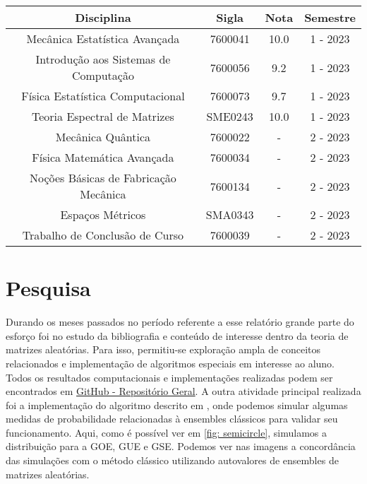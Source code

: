 \documentclass[12pt]{report}
\begin{document}
	\hspace{1cm}
	
	\begin{center}
		\begin{tabular}{|c|c|c|c|}
			\hline
			Disciplina & Sigla & Nota & Semestre \\
			\hline
			Mecânica Estatística Avançada & 7600041 & 10.0 & 1 - 2023 \\
			\hline
			Introdução aos Sistemas de Computação & 7600056 & 9.2 & 1 - 2023 \\
			\hline
			Física Estatística Computacional & 7600073 & 9.7 & 1 - 2023 \\
			\hline
			Teoria Espectral de Matrizes & SME0243 & 10.0 & 1 - 2023 \\
			\hline
			Mecânica Quântica & 7600022 & - & 2 - 2023 \\
			\hline
			Física Matemática Avançada & 7600034 & - & 2 - 2023 \\
			\hline
			Noções Básicas de Fabricação Mecânica & 7600134 & - & 2 - 2023 \\
			\hline
			Espaços Métricos & SMA0343 & - & 2 - 2023 \\
			\hline
			Trabalho de Conclusão de Curso & 7600039 & - & 2 - 2023 \\
			\hline
		\end{tabular}
	\end{center}
	
	\section{Pesquisa}
	
	Durando os meses passados no período referente a esse relatório grande parte do esforço foi no estudo da bibliografia e conteúdo de interesse dentro da teoria de matrizes aleatórias. Para isso, permitiu-se exploração ampla de conceitos relacionados e implementação de algoritmos especiais em interesse ao aluno. Todos os resultados computacionais e implementações realizadas podem ser encontrados em \href{https://github.com/Joao-vap/RMT-Code/tree/main}{GitHub - Repositório Geral}. A outra atividade principal realizada foi a implementação do algoritmo descrito em \cite{Chafa__2018}, onde podemos simular algumas medidas de probabilidade relacionadas à ensembles clássicos para validar seu funcionamento. Aqui, como é possível ver em \ref{fig: semicircle}, simulamos a distribuição para a GOE, GUE e GSE. Podemos ver nas imagens a concordância das simulações com o método clássico utilizando autovalores de ensembles de matrizes aleatórias.
\end{document}
